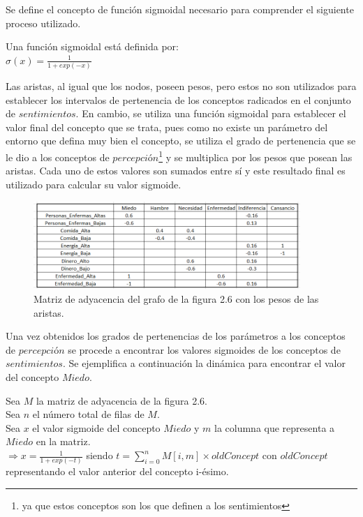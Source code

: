Se define el concepto de función sigmoidal necesario para comprender el siguiente proceso utilizado.\autocite{Saeed2021}
\begin{center}
    Una función sigmoidal está definida por:\\
    $\sigma(x)= \frac{1}{1+exp(-x)}$
\end{center}

Las aristas, al igual que los nodos, poseen pesos, pero estos no son utilizados para establecer los intervalos
de pertenencia de los conceptos radicados en el conjunto de $sentimientos$. En cambio, se utiliza una función 
sigmoidal para establecer el valor final del concepto que se trata, pues como no existe un parámetro del 
entorno que defina muy bien el concepto, se utiliza el grado de pertenencia que se le dio a los conceptos
de $percepci$ó$n$\footnote{ya que estos conceptos son los que definen a los sentimientos} y se multiplica por los pesos 
que posean las aristas. Cada uno de estos valores son sumados entre sí y este resultado final es utilizado 
para calcular su valor sigmoide.

\begin{figure}[htb]
    \centering
    \includegraphics[width=0.9\textwidth]{Graphics/Pesos_Perc_Sent.png}
    \caption{Matriz de adyacencia del grafo de la figura 2.6 con los pesos de las aristas.}
\end{figure}

Una vez obtenidos los grados de pertenencias de los parámetros a los conceptos de $percepci$ó$n$ se procede 
a encontrar los valores sigmoides de los conceptos de $sentimientos$. Se ejemplifica a continuación la dinámica
para encontrar el valor del concepto $Miedo$.
\begin{center}
    Sea $M$ la matriz de adyacencia de la figura 2.6.\\
    Sea $n$ el número total de filas de $M$.\\
    Sea $x$ el valor sigmoide del concepto $Miedo$ y $m$ la columna que representa a $Miedo$ en la matriz.\\
    $\Rightarrow x = \frac{1}{1+ exp(-t)}$ siendo $t = \displaystyle\sum_{i=0}^{n}M[i,m]\times oldConcept$ con $oldConcept$
    representando el valor anterior del concepto i-ésimo.
\end{center}

